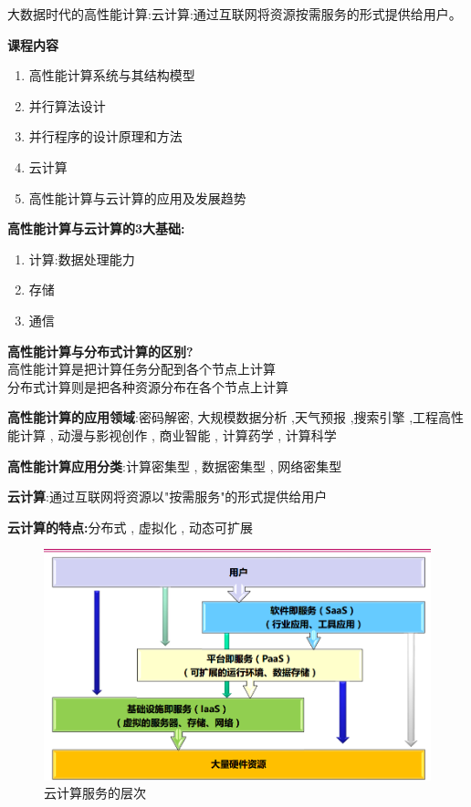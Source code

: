\documentclass[UTF8,a4paper]{ctexart}
\newcommand{\spaceline}{\vspace{\baselineskip}}
\begin{document}
  大数据时代的高性能计算:云计算:通过互联网将资源按需服务的形式提供给用户。

  \spaceline
  \textbf{课程内容}
  \begin{enumerate}
    \item 高性能计算系统与其结构模型
    \item 并行算法设计
    \item 并行程序的设计原理和方法
    \item 云计算
    \item 高性能计算与云计算的应用及发展趋势
  \end{enumerate}

  \spaceline
  \textbf{高性能计算与云计算的3大基础:}
  \begin{enumerate}
    \item 计算:数据处理能力

    \item 存储

    \item 通信
  \end{enumerate}

  \spaceline
  \textbf{高性能计算与分布式计算的区别?}\\
  高性能计算是把计算任务分配到各个节点上计算\\
  分布式计算则是把各种资源分布在各个节点上计算

  \textbf{高性能计算的应用领域}:密码解密, 大规模数据分析 ,天气预报 ,搜索引擎 ,工程高性能计算 , 动漫与影视创作 , 商业智能 , 计算药学 , 计算科学

  \textbf{高性能计算应用分类}:计算密集型 , 数据密集型 , 网络密集型

  \textbf{云计算}:通过互联网将资源以"按需服务"的形式提供给用户

  \textbf{云计算的特点:}分布式 , 虚拟化 , 动态可扩展

  \begin{figure}[H]
    \centering
    \includegraphics[scale = 0.3]{assets/ParallelComputing_e82fe.png}
    \caption{云计算服务的层次}
  \end{figure}
\end{document}
